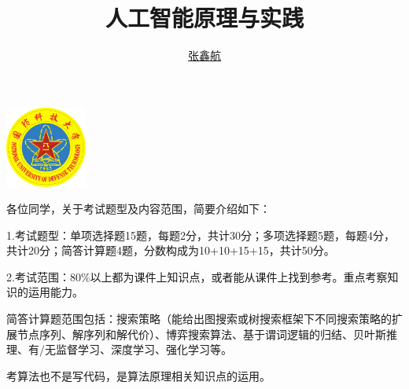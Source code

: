 \documentclass[cn,blue,12pt,normal]{elegantnote}
\title{人工智能原理与实践}
\author{\href{mailto:zhangxinhang19@foxmail.com}{张鑫航}}
\institute{国防科技大学}
\date{\zhtoday}
\begin{document}
\maketitle
\centerline{
  \includegraphics[width=0.2\textwidth]{figure/logo.pdf}
}
各位同学，关于考试题型及内容范围，简要介绍如下：

1.考试题型：单项选择题15题，每题2分，共计30分；多项选择题5题，每题4分，共计20分；简答计算题4题，分数构成为10+10+15+15，共计50分。

2.考试范围：80\%以上都为课件上知识点，或者能从课件上找到参考。重点考察知识的运用能力。

简答计算题范围包括：搜索策略（能给出图搜索或树搜索框架下不同搜索策略的扩展节点序列、解序列和解代价）、博弈搜索算法、基于谓词逻辑的归结、贝叶斯推理、有/无监督学习、深度学习、强化学习等。

考算法也不是写代码，是算法原理相关知识点的运用。
\newpage
\tableofcontents
\newpage






\end{document}
